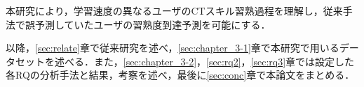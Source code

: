\documentclass[submit]{ipsj}
\begin{document}
本研究により，学習速度の異なるユーザのCTスキル習熟過程を理解し，従来手法で誤予測していたユーザの習熟度到達予測を可能にする．




以降，\ref{sec:relate}章で従来研究を述べ，\ref{sec:chapter_3-1}章で本研究で用いるデータセットを述べる．また，\ref{sec:chapter_3-2}，\ref{sec:rq2}，\ref{sec:rq3}章では設定した各RQの分析手法と結果，考察を述べ，最後に\ref{sec:conc}章で本論文をまとめる．
\end{document}
